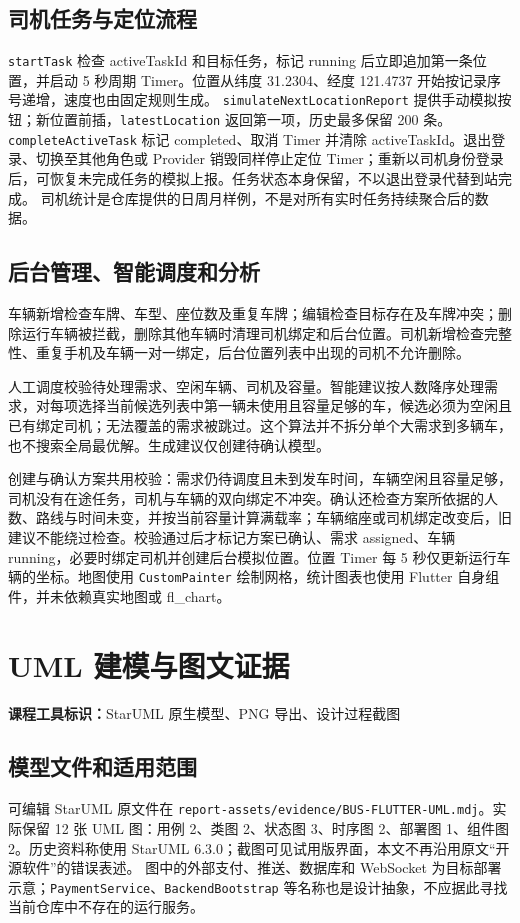 \documentclass[UTF8,fontset=fandol,zihao=-4,oneside]{ctexrep}
\newcommand{\pathcode}[1]{\nolinkurl{#1}}
\newcommand{\toolmark}[1]{\par\noindent\textbf{课程工具标识：}#1\par}
\begin{document}
\section{司机任务与定位流程}
\texttt{startTask} 检查 activeTaskId 和目标任务，标记 running 后立即追加第一条位置，并启动 5 秒周期 Timer。位置从纬度 31.2304、经度 121.4737 开始按记录序号递增，速度也由固定规则生成。
\texttt{simulateNextLocationReport} 提供手动模拟按钮；新位置前插，\texttt{latestLocation} 返回第一项，历史最多保留 200 条。\texttt{completeActiveTask} 标记 completed、取消 Timer 并清除 activeTaskId。退出登录、切换至其他角色或 Provider 销毁同样停止定位 Timer；重新以司机身份登录后，可恢复未完成任务的模拟上报。任务状态本身保留，不以退出登录代替到站完成。
司机统计是仓库提供的日周月样例，不是对所有实时任务持续聚合后的数据。

\section{后台管理、智能调度和分析}
车辆新增检查车牌、车型、座位数及重复车牌；编辑检查目标存在及车牌冲突；删除运行车辆被拦截，删除其他车辆时清理司机绑定和后台位置。司机新增检查完整性、重复手机及车辆一对一绑定，后台位置列表中出现的司机不允许删除。

人工调度校验待处理需求、空闲车辆、司机及容量。智能建议按人数降序处理需求，对每项选择当前候选列表中第一辆未使用且容量足够的车，候选必须为空闲且已有绑定司机；无法覆盖的需求被跳过。这个算法并不拆分单个大需求到多辆车，也不搜索全局最优解。生成建议仅创建待确认模型。

创建与确认方案共用校验：需求仍待调度且未到发车时间，车辆空闲且容量足够，司机没有在途任务，司机与车辆的双向绑定不冲突。确认还检查方案所依据的人数、路线与时间未变，并按当前容量计算满载率；车辆缩座或司机绑定改变后，旧建议不能绕过检查。校验通过后才标记方案已确认、需求 assigned、车辆 running，必要时绑定司机并创建后台模拟位置。位置 Timer 每 5 秒仅更新运行车辆的坐标。地图使用 \texttt{CustomPainter} 绘制网格，统计图表也使用 Flutter 自身组件，并未依赖真实地图或 fl\_chart。

\chapter{UML 建模与图文证据}
\toolmark{StarUML 原生模型、PNG 导出、设计过程截图}
\section{模型文件和适用范围}
可编辑 StarUML 原文件在 \pathcode{report-assets/evidence/BUS-FLUTTER-UML.mdj}。实际保留 12 张 UML 图：用例 2、类图 2、状态图 3、时序图 2、部署图 1、组件图 2。历史资料称使用 StarUML 6.3.0；截图可见试用版界面，本文不再沿用原文“开源软件”的错误表述。
图中的外部支付、推送、数据库和 WebSocket 为目标部署示意；\texttt{PaymentService}、\texttt{BackendBootstrap} 等名称也是设计抽象，不应据此寻找当前仓库中不存在的运行服务。
\end{document}
